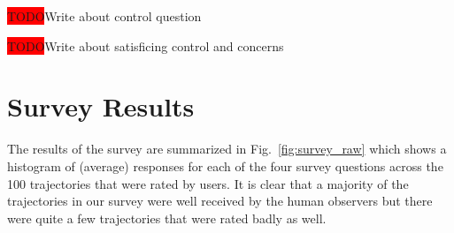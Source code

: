 \documentclass[letterpaper, 10 pt, conference]{ieeeconf}  %
\newcommand{\todo}{\colorbox{red}{TODO}}
\begin{document}
\todo Write about control question

\todo Write about satisficing control and concerns

\section{Survey Results}
\label{sec:analysis}
The results of the survey are summarized in Fig.~\ref{fig:survey_raw} which shows a histogram of (average) responses for each of the four survey questions across the 100 trajectories that were rated by users. It is clear that a majority of the trajectories in our survey were well received by the human observers but there were quite a few trajectories that were rated badly as well. 
\begin{figure}[t]

\end{figure}
\end{document}
